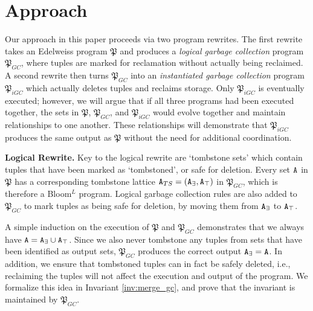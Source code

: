 
\section{Approach}
\label{sec:approach}

Our approach in this paper proceeds via two program rewrites.
The first rewrite takes an Edelweiss program $\mathfrak{P}$ and produces a \emph{logical garbage collection} program $\mathfrak{P}_{GC}$, where tuples are marked for reclamation without actually being reclaimed.
A second rewrite then turns $\mathfrak{P}_{GC}$ into an \emph{instantiated garbage collection} program $\mathfrak{P}_{iGC}$ which actually deletes tuples and reclaims storage.
Only $\mathfrak{P}_{iGC}$ is eventually executed;
however, we will argue that if all three programs had been executed together, the sets in $\mathfrak{P}$, $\mathfrak{P}_{GC}$, and $\mathfrak{P}_{iGC}$ would evolve together and maintain relationships to one another.
These relationships will demonstrate that $\mathfrak{P}_{iGC}$ produces the same output as $\mathfrak{P}$ without the need for additional coordination.

\textbf{Logical Rewrite.}
Key to the logical rewrite are `tombstone sets' which contain tuples that have been marked as `tombstoned', or safe for deletion.
Every set $\tt{A}$ in $\mathfrak{P}$ has a corresponding tombstone lattice $\tt{A}_{TS} = (\tt{A}_\exists, \tt{A}_\top)$ in $\mathfrak{P}_{GC}$, which is therefore a Bloom$^L$ program.
Logical garbage collection rules are also added to $\mathfrak{P}_{GC}$ to mark tuples as being safe for deletion, by moving them from $\tt{A}_\exists$ to $\tt{A}_\top$.

A simple induction on the execution of $\mathfrak{P}$ and $\mathfrak{P}_{GC}$ demonstrates that we always have $\tt{A} = \tt{A}_\exists \cup \tt{A}_\top$.
Since we also never tombstone any tuples from sets that have been identified as output sets,  $\mathfrak{P}_{GC}$ produces the correct output $\tt{A}_\exists = \tt{A}$.
In addition, we ensure that tombstoned tuples can in fact be safely deleted, i.e., reclaiming the tuples will not affect the execution and output of the program. 
We formalize this idea in Invariant \ref{inv:merge_gc}, and prove that the invariant is maintained by $\mathfrak{P}_{GC}$.

